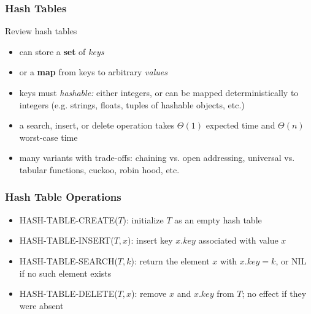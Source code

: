 \documentclass[10pt]{beamer}
\begin{document}

\begin{frame} \frametitle{Hash Tables}
Review hash tables
\begin{itemize}
  \item can store a \textbf{set} of \emph{keys}
  \item or a \textbf{map} from keys to arbitrary \emph{values}
  \item keys must \emph{hashable:} either integers, or can be mapped deterministically
    to integers (e.g. strings, floats, tuples of hashable objects, etc.)
  \item a search, insert, or delete operation takes $\Theta(1)$ expected time and
    $\Theta(n)$ worst-case time
  \item many variants with trade-offs: chaining vs. open addressing, universal vs.
    tabular functions, cuckoo, robin hood, etc.
\end{itemize}
\end{frame}

\begin{frame} \frametitle{Hash Table Operations}
  \begin{itemize}
  \item HASH-TABLE-CREATE($T$): initialize $T$ as an empty hash table
    \item HASH-TABLE-INSERT($T, x$): insert key $x.key$ associated with value $x$
    \item HASH-TABLE-SEARCH($T, k$): return the element $x$ with $x.key=k$, or NIL if no such element exists
    \item HASH-TABLE-DELETE($T, x$): remove $x$ and $x.key$ from $T$; no effect if they were absent
  \end{itemize}
  \end{frame}
\end{document}
